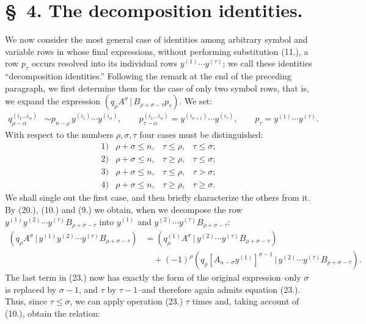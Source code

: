 \documentclass[11pt]{article}
\newcommand{\pair}[2]{(#1\,|\,#2)}
\begin{document}
\section*{\S\ 4. The decomposition identities.}
We now consider the most general case of identities among arbitrary symbol and variable rows in whose final expressions, without performing substitution (11.), a row $p_\tau$ occurs resolved into its individual rows $y^{(1)}\cdots y^{(\tau)}$; we call these identities ``decomposition identities.'' Following the remark at the end of the preceding paragraph, we first determine them for the case of only two symbol rows, that is, we expand the expression $\pair{q_\rho A^\sigma}{B_{\rho+\sigma-\tau}p_\tau}$. We set:
\begin{equation}
\begin{aligned}
q_{\rho-\alpha}^{(i_1\ldots i_\alpha)}&\sim p_{n-\rho}\,y^{(i_1)}\cdots y^{(i_\alpha)},\qquad
p_{\tau-\alpha}^{(i_1\ldots i_\alpha)}=y^{(i_{\alpha+1})}\cdots y^{(i_\tau)},\qquad
p_\tau=y^{(1)}\cdots y^{(\tau)}.
\end{aligned}
\tag{22}
\end{equation}
With respect to the numbers $\rho,\sigma,\tau$ four cases must be distinguished:
\[
\begin{array}{llll}
1)&\rho+\sigma\le n,& \tau\le\rho,& \tau\le\sigma;\\[2pt]
2)&\rho+\sigma\le n,& \tau\ge\rho,& \tau\le\sigma;\\[2pt]
3)&\rho+\sigma\le n,& \tau\le\rho,& \tau>\sigma;\\[2pt]
4)&\rho+\sigma\le n,& \tau\ge\rho,& \tau\ge\sigma.
\end{array}
\]
We shall single out the first case, and then briefly characterize the others from it. By (20.), (10.) and (9.) we obtain, when we decompose the row $y^{(1)}y^{(2)}\cdots y^{(\tau)}B_{\rho+\sigma-\tau}$ into $y^{(1)}$ and $y^{(2)}\cdots y^{(\tau)}B_{\rho+\sigma-\tau}$:
\begin{equation}
\begin{aligned}
\pair{q_\rho A^\sigma}{y^{(1)}y^{(2)}\cdots y^{(\tau)}B_{\rho+\sigma-\tau}}
&=\pair{q_\rho^{(1)}A^\sigma}{y^{(2)}\cdots y^{(\tau)}B_{\rho+\sigma-\tau}}\\
&\quad+(-1)^\rho\pair{q_\rho[A_{n-\sigma}y^{(1)}]^{\sigma-1}}{y^{(2)}\cdots y^{(\tau)}B_{\rho+\sigma-\tau}}.
\end{aligned}
\tag{23}
\end{equation}
The last term in (23.) now has exactly the form of the original expression--only $\sigma$ is replaced by $\sigma-1$, and $\tau$ by $\tau-1$--and therefore again admits equation (23.). Thus, since $\tau\le\sigma$, we can apply operation (23.) $\tau$ times and, taking account of (10.), obtain the relation:
\end{document}
